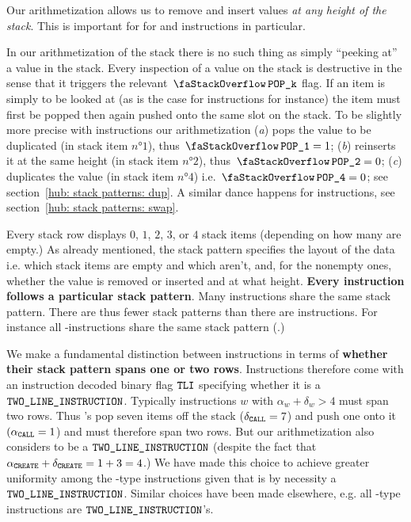 \saNote{}\label{note: touch stack items at any height} Our arithmetization allows us to remove and insert values \emph{at any height of the stack}. This is important for for  and  instructions in particular.

\saNote{} In our arithmetization of the stack there is no such thing as simply ``peeking at'' a value in the stack.
Every inspection of a value on the stack is destructive in the sense that it triggers the relevant $\stackItemPop{k}$ flag.
If an item is simply to be looked at (as is the case for  instructions for instance) the item must first be popped then again pushed onto the same slot on the stack.
To be slightly more precise with  instructions our arithmetization
(\emph{a}) pops the value to be duplicated (in stack item $n°1$), thus $\stackItemPop{1} = 1$;
(\emph{b}) reinserts it at the same height (in stack item $n°2$), thus $\stackItemPop{2} = 0$;
(\emph{c}) duplicates the value (in stack item $n°4$) i.e. $\stackItemPop{4} = 0$; see section~\ref{hub: stack patterns: dup}. A similar dance happens for  instructions, see section~\ref{hub: stack patterns: swap}.

Every stack row displays $0$, $1$, $2$, $3$, or $4$ stack items (depending on how many are empty.)
As already mentioned, the stack pattern specifies the layout of the data i.e. which stack items are empty and which aren't, and, for the nonempty ones, whether the value is removed or inserted and at what height.
\textbf{Every instruction follows a particular stack pattern}. Many instructions share the same stack pattern. There are thus fewer stack patterns than there are instructions. For instance all -instructions share the same stack pattern (\dupSP.)

We make a fundamental distinction between instructions in terms of \textbf{whether their stack pattern spans one or two rows}. Instructions therefore come with an instruction decoded binary flag $\texttt{TLI}$ specifying whether it is a $\texttt{TWO\_LINE\_INSTRUCTION}$. Typically instructions $w$ with $\alpha_{w} + \delta_{w} > 4$ must span two rows. Thus 's pop seven items off the stack ($\delta_{\texttt{CALL}} = 7$) and push one onto it $(\alpha_{\texttt{CALL}} = 1$) and must therefore span two rows. But our arithmetization also considers  to be a $\texttt{TWO\_LINE\_INSTRUCTION}$ (despite the fact that $\alpha_{\texttt{CREATE}} + \delta_{\texttt{CREATE}} = 1 + 3 = 4$.) We have made this choice to achieve greater uniformity among the -type instructions given that  is by necessity a $\texttt{TWO\_LINE\_INSTRUCTION}$. Similar choices have been made elsewhere, e.g. all -type instructions are $\texttt{TWO\_LINE\_INSTRUCTION}$'s.
